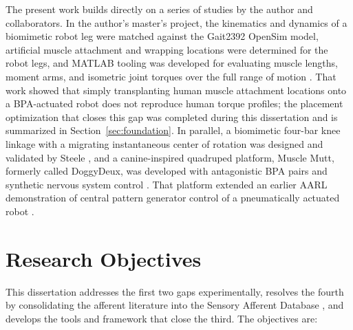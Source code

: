 The present work builds directly on a series of studies by the author and collaborators. In the author's master's project, the kinematics and dynamics of a biomimetic robot leg were matched against the Gait2392 OpenSim model, artificial muscle attachment and wrapping locations were determined for the robot legs, and MATLAB tooling was developed for evaluating muscle lengths, moment arms, and isometric joint torques over the full range of motion \citep{bolen_bipedal_2019, bolen_determination_2019}. That work showed that simply transplanting human muscle attachment locations onto a BPA-actuated robot does not reproduce human torque profiles; the placement optimization that closes this gap was completed during this dissertation and is summarized in Section~\ref{sec:foundation}. In parallel, a biomimetic four-bar knee linkage with a migrating instantaneous center of rotation was designed and validated by Steele \citep{steele_development_2017, steele_biomimetic_2018, steele_biomimetic_2018-1}, and a canine-inspired quadruped platform, Muscle Mutt, formerly called DoggyDeux, was developed with antagonistic BPA pairs and synthetic nervous system control \citep{scharzenberger_design_2019}. That platform extended an earlier AARL demonstration of central pattern generator control of a pneumatically actuated robot \citep{hunt_development_2017}.

\section{Research Objectives}\label{sec:objectives}

This dissertation addresses the first two gaps experimentally, resolves the fourth by consolidating the afferent literature into the Sensory Afferent Database \citep{bolen_sensory_2023, bolen_using_2024}, and develops the tools and framework that close the third. The objectives are:

